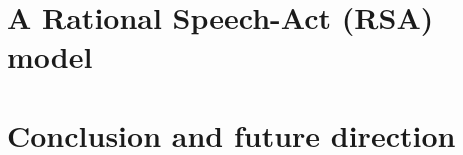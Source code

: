 \documentclass[10pt,letterpaper]{article}
\begin{document}
\section{A Rational Speech-Act (RSA) model}
\label{sec:RSA}


%

\section{Conclusion and future direction}
\label{sec:Conclusion}









\setlength{\bibleftmargin}{.125in}
\setlength{\bibindent}{-\bibleftmargin}


\end{document}

